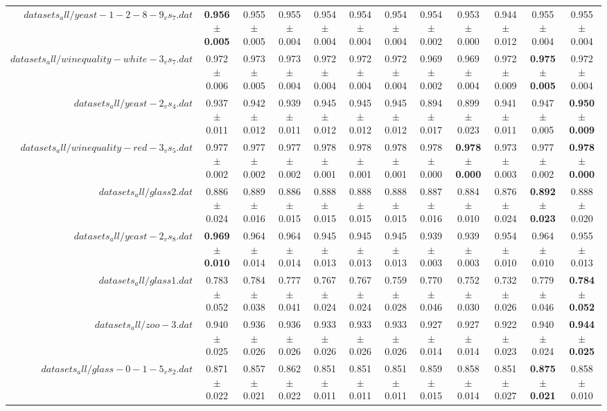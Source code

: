 \begin{table}[!ht]
{\begin{tabular}{r c c c c c c c c c c c}
$datasets_all/yeast-1-2-8-9_vs_7.dat$ & \textbf{0.956 $\pm$ 0.005} & 0.955 $\pm$ 0.005 & 0.955 $\pm$ 0.004 & 0.954 $\pm$ 0.004 & 0.954 $\pm$ 0.004 & 0.954 $\pm$ 0.004 & 0.954 $\pm$ 0.002 & 0.953 $\pm$ 0.000 & 0.944 $\pm$ 0.012 & 0.955 $\pm$ 0.004 & 0.955 $\pm$ 0.004 \\
$datasets_all/winequality-white-3_vs_7.dat$ & 0.972 $\pm$ 0.006 & 0.973 $\pm$ 0.005 & 0.973 $\pm$ 0.004 & 0.972 $\pm$ 0.004 & 0.972 $\pm$ 0.004 & 0.972 $\pm$ 0.004 & 0.969 $\pm$ 0.002 & 0.969 $\pm$ 0.004 & 0.972 $\pm$ 0.009 & \textbf{0.975 $\pm$ 0.005} & 0.972 $\pm$ 0.004 \\
$datasets_all/yeast-2_vs_4.dat$ & 0.937 $\pm$ 0.011 & 0.942 $\pm$ 0.012 & 0.939 $\pm$ 0.011 & 0.945 $\pm$ 0.012 & 0.945 $\pm$ 0.012 & 0.945 $\pm$ 0.012 & 0.894 $\pm$ 0.017 & 0.899 $\pm$ 0.023 & 0.941 $\pm$ 0.011 & 0.947 $\pm$ 0.005 & \textbf{0.950 $\pm$ 0.009} \\
$datasets_all/winequality-red-3_vs_5.dat$ & 0.977 $\pm$ 0.002 & 0.977 $\pm$ 0.002 & 0.977 $\pm$ 0.002 & 0.978 $\pm$ 0.001 & 0.978 $\pm$ 0.001 & 0.978 $\pm$ 0.001 & 0.978 $\pm$ 0.000 & \textbf{0.978 $\pm$ 0.000} & 0.973 $\pm$ 0.003 & 0.977 $\pm$ 0.002 & \textbf{0.978 $\pm$ 0.000} \\
$datasets_all/glass2.dat$ & 0.886 $\pm$ 0.024 & 0.889 $\pm$ 0.016 & 0.886 $\pm$ 0.015 & 0.888 $\pm$ 0.015 & 0.888 $\pm$ 0.015 & 0.888 $\pm$ 0.015 & 0.887 $\pm$ 0.016 & 0.884 $\pm$ 0.010 & 0.876 $\pm$ 0.024 & \textbf{0.892 $\pm$ 0.023} & 0.888 $\pm$ 0.020 \\
$datasets_all/yeast-2_vs_8.dat$ & \textbf{0.969 $\pm$ 0.010} & 0.964 $\pm$ 0.014 & 0.964 $\pm$ 0.014 & 0.945 $\pm$ 0.013 & 0.945 $\pm$ 0.013 & 0.945 $\pm$ 0.013 & 0.939 $\pm$ 0.003 & 0.939 $\pm$ 0.003 & 0.954 $\pm$ 0.010 & 0.964 $\pm$ 0.010 & 0.955 $\pm$ 0.013 \\
$datasets_all/glass1.dat$ & 0.783 $\pm$ 0.052 & 0.784 $\pm$ 0.038 & 0.777 $\pm$ 0.041 & 0.767 $\pm$ 0.024 & 0.767 $\pm$ 0.024 & 0.759 $\pm$ 0.028 & 0.770 $\pm$ 0.046 & 0.752 $\pm$ 0.030 & 0.732 $\pm$ 0.026 & 0.779 $\pm$ 0.046 & \textbf{0.784 $\pm$ 0.052} \\
$datasets_all/zoo-3.dat$ & 0.940 $\pm$ 0.025 & 0.936 $\pm$ 0.026 & 0.936 $\pm$ 0.026 & 0.933 $\pm$ 0.026 & 0.933 $\pm$ 0.026 & 0.933 $\pm$ 0.026 & 0.927 $\pm$ 0.014 & 0.927 $\pm$ 0.014 & 0.922 $\pm$ 0.023 & 0.940 $\pm$ 0.024 & \textbf{0.944 $\pm$ 0.025} \\
$datasets_all/glass-0-1-5_vs_2.dat$ & 0.871 $\pm$ 0.022 & 0.857 $\pm$ 0.021 & 0.862 $\pm$ 0.022 & 0.851 $\pm$ 0.011 & 0.851 $\pm$ 0.011 & 0.851 $\pm$ 0.011 & 0.859 $\pm$ 0.015 & 0.858 $\pm$ 0.014 & 0.851 $\pm$ 0.027 & \textbf{0.875 $\pm$ 0.021} & 0.858 $\pm$ 0.010 \\

\end{tabular}}
\end{table}
